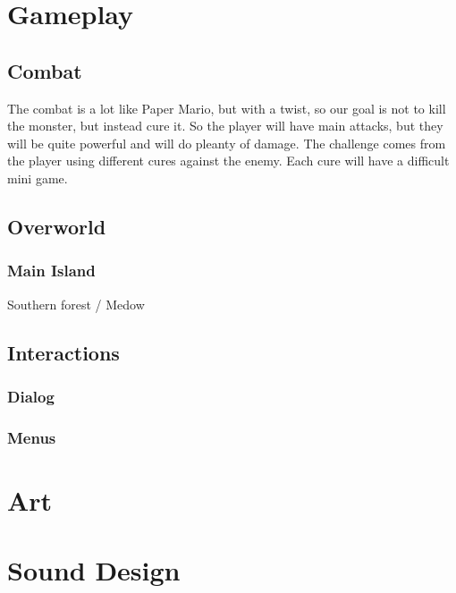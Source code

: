 \documentclass{article}
\begin{document}
\section{Gameplay} 

\subsection{Combat} 
The combat is a lot like Paper Mario, but with a twist, so our goal is not to kill the monster, but instead cure it. So the player will have main attacks, but they will be quite powerful and will do pleanty of damage. The challenge comes from the player using different cures against the enemy. Each cure will have a difficult mini game.

\subsection{Overworld}

\subsubsection{Main Island}
Southern forest / Medow

\subsection{Interactions}
\subsubsection{Dialog}
\subsubsection{Menus} 

\section{Art}

\section{Sound Design}
\end{document}
